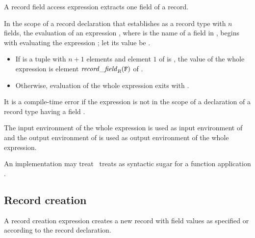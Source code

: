 \label{section:field-access}
A record field access expression extracts one field of a record.

\EVALUATION

In the scope of a record declaration that establishes  as
a record type with $n$ fields, the evaluation of an expression
, where  is the name of a field in ,
begins with
evaluating the expression ; let its value be .
\begin{itemize}
\item If  is a tuple with $n+1$ elements and element $1$
of  is , the value of the whole expression is
element $\mathit{record\_field}_{\mbox{\scriptsize\tt{\sl{R}}}}({\tt{\sl F}})$ of .
\item Otherwise, evaluation of the whole expression exits
with .
\end{itemize}
It is a compile-time error if the expression is not in the scope of
a declaration of a record type  having a field .

\ENVIRONMENTS

The input environment of the whole expression is used as input environment
of  and the output environment of  is used as output environment of the
whole expression.

\NOTE

\ifStd An implementation may treat \fi
\ifOld \OldErlang\ treats \fi
{}
as syntactic sugar for a function application
.

\subsection{Record creation}

\label{section:record-creation}

A record creation expression creates a new record with field values as specified
or according to the record declaration.

\EVALUATION

